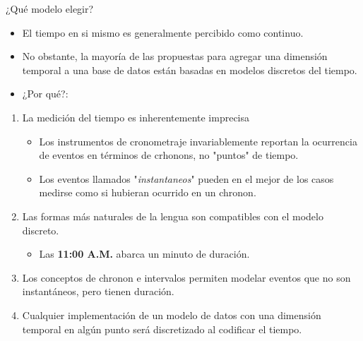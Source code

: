 \documentclass[handout, t, aspectratio=169]{beamer}
\begin{document}
\begin{frame}{¿Qué modelo elegir?}
    \begin{itemize}
        \item El tiempo en si mismo es generalmente percibido como continuo.\pause
        \item No obstante, la mayoría de las propuestas para agregar una dimensión temporal a una base de datos están basadas en modelos discretos del tiempo.\pause
        \item ¿Por qué?:\pause
    \end{itemize}
    \begin{enumerate}
        \item La medición del tiempo es inherentemente imprecisa\pause
        \begin{itemize}
            \item Los instrumentos de cronometraje invariablemente reportan la ocurrencia de eventos en términos de crhonons, no "puntos" de tiempo.\pause
            \item Los eventos llamados "\textit{instantaneos}" pueden en el mejor de los casos medirse como si hubieran ocurrido en un chronon.\pause
        \end{itemize}
        \item Las formas más naturales de la lengua son compatibles con el modelo discreto.\pause
        \begin{itemize}
            \item Las \textbf{11:00 A.M.} abarca un minuto de duración.
        \end{itemize}\pause
        \item Los conceptos de chronon e intervalos permiten modelar eventos que no son instantáneos, pero tienen duración.\pause
        \item Cualquier implementación de un modelo de datos con una dimensión temporal en algún punto será discretizado al codificar el tiempo.
    \end{enumerate}
\end{frame}
\end{document}
